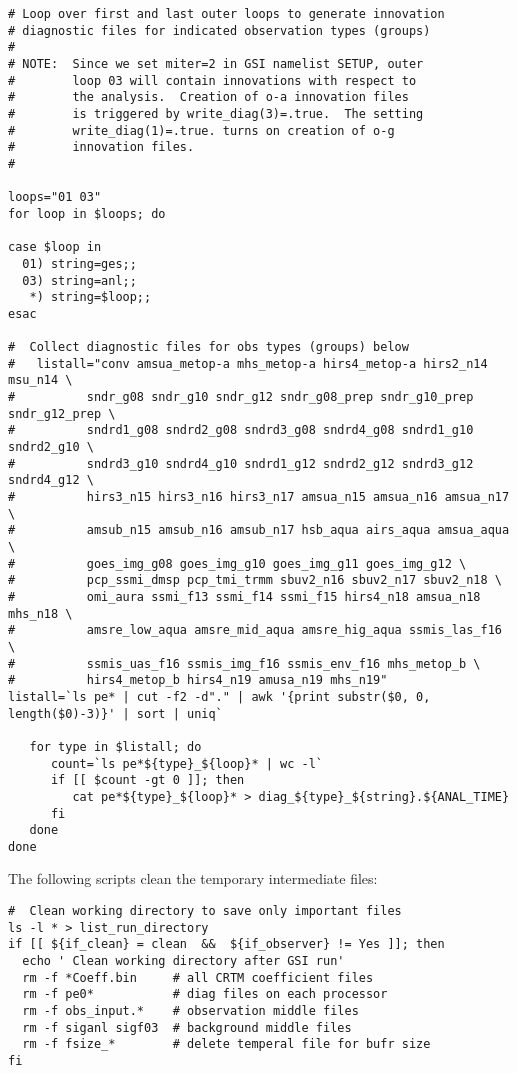 \begin{footnotesize}
\begin{verbatim}
# Loop over first and last outer loops to generate innovation
# diagnostic files for indicated observation types (groups)
#
# NOTE:  Since we set miter=2 in GSI namelist SETUP, outer
#        loop 03 will contain innovations with respect to
#        the analysis.  Creation of o-a innovation files
#        is triggered by write_diag(3)=.true.  The setting
#        write_diag(1)=.true. turns on creation of o-g
#        innovation files.
#

loops="01 03"
for loop in $loops; do

case $loop in
  01) string=ges;;
  03) string=anl;;
   *) string=$loop;;
esac

#  Collect diagnostic files for obs types (groups) below
#   listall="conv amsua_metop-a mhs_metop-a hirs4_metop-a hirs2_n14 msu_n14 \
#          sndr_g08 sndr_g10 sndr_g12 sndr_g08_prep sndr_g10_prep sndr_g12_prep \
#          sndrd1_g08 sndrd2_g08 sndrd3_g08 sndrd4_g08 sndrd1_g10 sndrd2_g10 \
#          sndrd3_g10 sndrd4_g10 sndrd1_g12 sndrd2_g12 sndrd3_g12 sndrd4_g12 \
#          hirs3_n15 hirs3_n16 hirs3_n17 amsua_n15 amsua_n16 amsua_n17 \
#          amsub_n15 amsub_n16 amsub_n17 hsb_aqua airs_aqua amsua_aqua \
#          goes_img_g08 goes_img_g10 goes_img_g11 goes_img_g12 \
#          pcp_ssmi_dmsp pcp_tmi_trmm sbuv2_n16 sbuv2_n17 sbuv2_n18 \
#          omi_aura ssmi_f13 ssmi_f14 ssmi_f15 hirs4_n18 amsua_n18 mhs_n18 \
#          amsre_low_aqua amsre_mid_aqua amsre_hig_aqua ssmis_las_f16 \
#          ssmis_uas_f16 ssmis_img_f16 ssmis_env_f16 mhs_metop_b \
#          hirs4_metop_b hirs4_n19 amusa_n19 mhs_n19"
listall=`ls pe* | cut -f2 -d"." | awk '{print substr($0, 0, length($0)-3)}' | sort | uniq`

   for type in $listall; do
      count=`ls pe*${type}_${loop}* | wc -l`
      if [[ $count -gt 0 ]]; then
         cat pe*${type}_${loop}* > diag_${type}_${string}.${ANAL_TIME}
      fi
   done
done
\end{verbatim}
\end{footnotesize}

The following scripts clean the temporary intermediate files:

\begin{footnotesize}
\begin{verbatim}
#  Clean working directory to save only important files
ls -l * > list_run_directory
if [[ ${if_clean} = clean  &&  ${if_observer} != Yes ]]; then
  echo ' Clean working directory after GSI run'
  rm -f *Coeff.bin     # all CRTM coefficient files
  rm -f pe0*           # diag files on each processor
  rm -f obs_input.*    # observation middle files
  rm -f siganl sigf03  # background middle files
  rm -f fsize_*        # delete temperal file for bufr size
fi
\end{verbatim}
\end{footnotesize}

